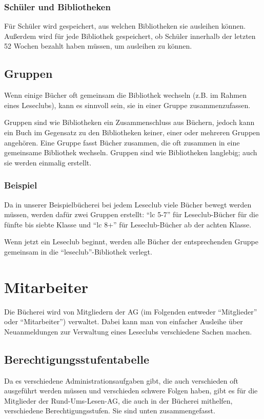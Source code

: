 \subsubsection{Schüler und Bibliotheken}
\label{subsubsec:library_group:library:people}
Für Schüler wird gespeichert, aus welchen Bibliotheken sie ausleihen können. Außerdem wird für jede Bibliothek gespeichert, ob Schüler innerhalb der letzten 52 Wochen bezahlt haben müssen, um ausleihen zu können.

\subsection{Gruppen}
\label{subsec:library_group:group}
Wenn einige Bücher oft gemeinsam die Bibliothek wechseln (z.B. im Rahmen eines Leseclubs), kann es sinnvoll sein, sie in einer Gruppe zusammenzufassen.

Gruppen sind wie Bibliotheken ein Zusammenschluss aus Büchern, jedoch kann ein Buch im Gegensatz zu den Bibliotheken keiner, einer oder mehreren Gruppen angehören. Eine Gruppe fasst Bücher zusammen, die oft zusammen in eine gemeinsame Bibliothek wechseln.
Gruppen sind wie Bibliotheken langlebig; auch sie werden einmalig erstellt.

\subsubsection{Beispiel}
\label{subsubsec:library_group:group:example}
Da in unserer Beispielbücherei  bei jedem Leseclub viele Bücher bewegt werden müssen, werden dafür zwei Gruppen erstellt: ``lc 5-7'' für Leseclub-Bücher für die fünfte bis siebte Klasse und ``lc 8+'' für Leseclub-Bücher ab der achten Klasse.

Wenn jetzt ein Leseclub beginnt, werden alle Bücher der entsprechenden Gruppe gemeinsam in die ``leseclub''-Bibliothek verlegt.

\section{Mitarbeiter}
\label{sec:member}
Die Bücherei wird von Mitgliedern der AG (im Folgenden entweder  ``Mitglieder'' oder ``Mitarbeiter'') verwaltet. Dabei kann man von einfacher Ausleihe über Neuanmeldungen zur Verwaltung eines Leseclubs verschiedene Sachen machen.

\subsection{Berechtigungsstufentabelle}
\label{subsec:member:permission_table}
Da es verschiedene Administrationsaufgaben gibt, die auch verschieden oft ausgeführt werden müssen und verschieden schwere Folgen haben, gibt es für die Mitglieder der Rund-Ums-Lesen-AG, die auch in der Bücherei mithelfen, verschiedene Berechtigungsstufen. Sie sind unten zusammengefasst.

